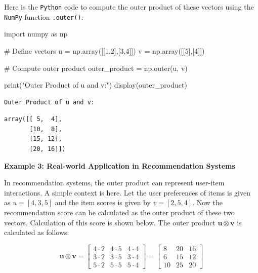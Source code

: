 \documentclass[
  letterpaper,
  DIV=11,
  numbers=noendperiod]{scrreprt}
\newenvironment{Shaded}{\begin{snugshade}}{\end{snugshade}}
\newcommand{\BuiltInTok}[1]{\textcolor[rgb]{0.00,0.23,0.31}{#1}}
\newcommand{\CommentTok}[1]{\textcolor[rgb]{0.37,0.37,0.37}{#1}}
\newcommand{\DecValTok}[1]{\textcolor[rgb]{0.68,0.00,0.00}{#1}}
\newcommand{\ImportTok}[1]{\textcolor[rgb]{0.00,0.46,0.62}{#1}}
\newcommand{\NormalTok}[1]{\textcolor[rgb]{0.00,0.23,0.31}{#1}}
\newcommand{\OperatorTok}[1]{\textcolor[rgb]{0.37,0.37,0.37}{#1}}
\newcommand{\StringTok}[1]{\textcolor[rgb]{0.13,0.47,0.30}{#1}}
\theoremstyle{plain}
\theoremstyle{definition}
\theoremstyle{remark}
\begin{document}
Here is the \texttt{Python} code to compute the outer product of these
vectors using the \texttt{NumPy} function \texttt{.outer()}:

\begin{Shaded}
\begin{Highlighting}[]
\ImportTok{import}\NormalTok{ numpy }\ImportTok{as}\NormalTok{ np}

\CommentTok{\# Define vectors}
\NormalTok{u }\OperatorTok{=}\NormalTok{ np.array([[}\DecValTok{1}\NormalTok{,}\DecValTok{2}\NormalTok{],[}\DecValTok{3}\NormalTok{,}\DecValTok{4}\NormalTok{]])}
\NormalTok{v }\OperatorTok{=}\NormalTok{ np.array([[}\DecValTok{5}\NormalTok{],[}\DecValTok{4}\NormalTok{]])}

\CommentTok{\# Compute outer product}
\NormalTok{outer\_product }\OperatorTok{=}\NormalTok{ np.outer(u, v)}

\BuiltInTok{print}\NormalTok{(}\StringTok{"Outer Product of u and v:"}\NormalTok{)}
\NormalTok{display(outer\_product)}
\end{Highlighting}
\end{Shaded}

\begin{verbatim}
Outer Product of u and v:
\end{verbatim}

\begin{verbatim}
array([[ 5,  4],
       [10,  8],
       [15, 12],
       [20, 16]])
\end{verbatim}

\textbf{Example 3: Real-world Application in Recommendation Systems}

In recommendation systems, the outer product can represent user-item
interactions. A simple context is here. Let the user preferences of
items is given as \(u=[4, 3, 5]\) and the item scores is given by
\(v=[2, 5, 4]\). Now the recommendation score can be calculated as the
outer product of these two vectors. Calculation of this score is shown
below. The outer product \(\mathbf{u} \otimes \mathbf{v}\) is calculated
as follows:

\[\mathbf{u} \otimes \mathbf{v} = \begin{bmatrix}
4 \cdot 2 & 4 \cdot 5 & 4 \cdot 4 \\
3 \cdot 2 & 3 \cdot 5 & 3 \cdot 4 \\
5 \cdot 2 & 5 \cdot 5 & 5 \cdot 4
\end{bmatrix}
= \begin{bmatrix}
8 & 20 & 16 \\
6 & 15 & 12 \\
10 & 25 & 20
\end{bmatrix}\]
\end{document}
